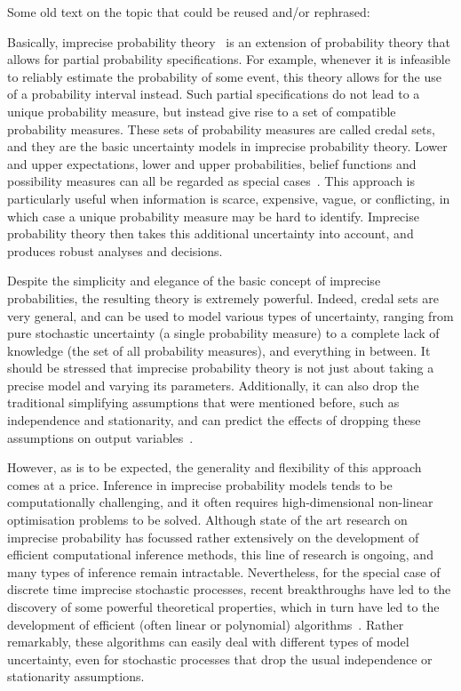 \documentclass[11pt,dvipsnames,usenames,a4paper]{article}
\begin{document}
{\color{Gray}
Some old text on the topic that could be reused and/or rephrased:

Basically, imprecise probability theory~\cite{augustin2013:itip,walley1991,troffaes2013:lp} is an extension of probability theory that allows for partial probability specifications.
For example, whenever it is infeasible to reliably estimate the probability of some event, this theory allows for the use of a probability interval instead.
Such partial specifications do not lead to a unique probability measure, but instead give rise to a set of compatible probability measures.
These sets of probability measures are called credal sets, and they are the basic uncertainty models in imprecise probability theory.
Lower and upper expectations, lower and upper probabilities, belief functions and possibility measures can all be regarded as special cases~\cite{walley2000}.
This approach is particularly useful when information is scarce, expensive, vague, or conflicting, in which case a unique probability measure may be hard to identify. Imprecise probability theory then takes this additional uncertainty into account, and produces robust analyses and decisions.

Despite the simplicity and elegance of the basic concept of imprecise probabilities, the resulting theory is extremely powerful.
Indeed, credal sets are very general, and can be used to model various types of uncertainty, ranging from pure stochastic uncertainty (a single probability measure) to a complete lack of knowledge (the set of all probability measures), and everything in between.
It should be stressed that imprecise probability theory is not just about taking a precise model and varying its parameters.
Additionally, it can also drop the traditional simplifying assumptions that were mentioned before, such as independence and stationarity, and can predict the effects of dropping these assumptions on output variables~\cite{couso1999b,walley1991,cozman2000}.

However, as is to be expected, the generality and flexibility of this approach comes at a price.
Inference in imprecise probability models tends to be computationally challenging, and it often requires high-dimensional non-linear optimisation problems to be solved.
Although state of the art research on imprecise probability has focussed rather extensively on the development of efficient computational inference methods, this line of research is ongoing, and many types of inference remain intractable.
Nevertheless, for the special case of discrete time imprecise stochastic processes, recent breakthroughs have led to the discovery of some powerful theoretical properties, which in turn have led to the development  of efficient (often linear or polynomial) algorithms~\cite{cooman2009,cooman2008}.
Rather remarkably, these algorithms can easily deal with different types of model uncertainty, even for stochastic processes that drop the usual independence or stationarity assumptions.
}
\end{document}
